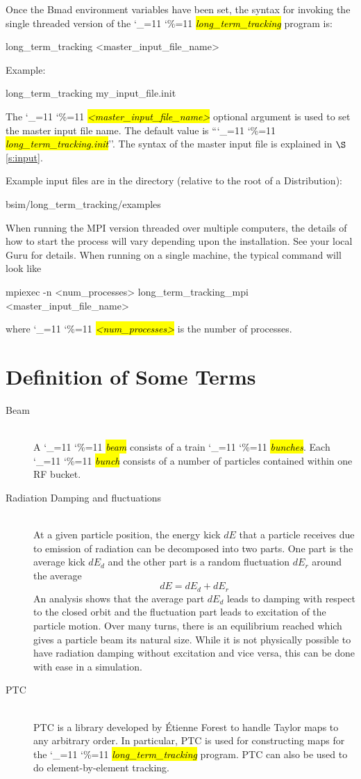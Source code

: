 \documentclass{hitec}
\newcommand\dottcmd[1]{\hl{\em#1}\endgroup}
\newcommand{\vn}{\begingroup\catcode`\_=11 \catcode`\%=11 \dottcmd}
\newcommand{\ltt}{\vn{long_term_tracking}\xspace}
\newcommand{\Newline}{\hfil \\}
\newcommand{\sref}[1]{$\S$\ref{#1}}
\newcommand{\Section}[1]{\section{#1}\vspace*{-1ex}}
\begin{document}
Once the Bmad environment variables have been set, the syntax for invoking the single threaded
version of the \ltt program is:
\begin{code}
long_term_tracking {<master_input_file_name>}
\end{code}
Example:
\begin{code}
long_term_tracking my_input_file.init
\end{code}
The \vn{<master_input_file_name>} optional argument is used to set the master input file name. The
default value is ``\vn{long_term_tracking.init}''. The syntax of the master input file is explained
in \sref{s:input}.

Example input files are in the directory (relative to the root of a Distribution):
\begin{code}
bsim/long_term_tracking/examples
\end{code}

When running the MPI version threaded over multiple computers, the details of how to start the process will
vary depending upon the installation. See your local Guru for details. When running on a single machine, 
the typical command will look like
\begin{code}
mpiexec -n <num_processes> long_term_tracking_mpi {<master_input_file_name>}
\end{code}
where \vn{<num_processes>} is the number of processes. 

\Section{Definition of Some Terms}
\label{s:def}

\begin{description}
\item[Beam] \Newline
A \vn{beam} consists of a train \vn{bunches}. Each \vn{bunch} consists of a number of particles contained
within one RF bucket.
%
\item[Radiation Damping and fluctuations] \Newline
At a given particle position, the energy kick $dE$ that a particle receives due to emission of
radiation can be decomposed into two parts. One part is the average kick $dE_d$ and the other part
is a random fluctuation $dE_r$ around the average 
\begin{equation}
  dE = dE_d + dE_r
\end{equation}
An analysis shows that the average part $dE_d$ leads to damping with respect to the closed orbit and
the fluctuation part leads to excitation of the particle motion. Over many turns, there is an
equilibrium reached which gives a particle beam its natural size. While it is not physically
possible to have radiation damping without excitation and vice versa, this can be done with ease in
a simulation.
%
\item[PTC] \Newline
PTC is a library developed by \'Etienne Forest to handle Taylor maps to any arbitrary order. In
particular, PTC is used for constructing maps for the \vn{long_term_tracking} program. PTC can also
be used to do element-by-element tracking.
\end{description}
\end{document}
